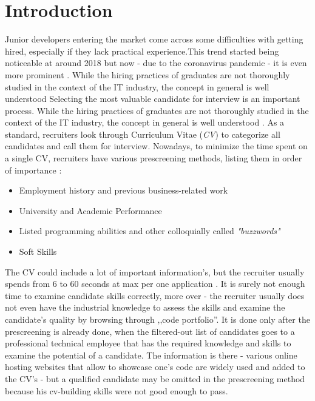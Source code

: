 \section{Introduction}
\label{sec:introduction}

Junior developers entering the market come across some difficulties with getting hired, especially if they lack practical experience\cite{PlightJuniorSoftwareDeveloper}.This trend started being noticeable at around 2018\cite{WhoKilledJuniorDeveloper} but now - due to the coronavirus pandemic - it is even more prominent \cite{EffectsCOVIDJuniorDevelopers}.
While the hiring practices of graduates are not thoroughly studied in the context of
the IT industry, the concept in general is well understood
Selecting the most valuable candidate for interview is an important process. While the hiring practices of graduates are not thoroughly studied in the context of the IT industry, the concept in general is well understood \cite{HiringProcess}. As a standard, recruiters look through Curriculum Vitae (\emph{CV}) to categorize all candidates and call them for interview. Nowadays, to minimize the time spent on a single CV, recruiters have various prescreening methods, listing them in order of importance \cite{SantanderCVLectureScholarship}:
\begin{itemize}
  \item Employment history and previous business-related work
  \item University and Academic Performance
  \item Listed programming abilities and other colloquially called \emph{"buzzwords"}
  \item Soft Skills
\end{itemize}

The CV could include a lot of important information's, but the recruiter usually spends from 6 to 60 seconds at max per one application \cite{SantanderCVLectureScholarship}. It is surely not enough time to examine candidate skills correctly, more over - the recruiter usually does not even have the industrial knowledge to assess the skills and examine the candidate's quality by browsing through ,,code portfolio''. It is done only after the prescreening is already done, when the filtered-out list of candidates goes to a professional technical employee that has the required knowledge and skills to examine the potential of a candidate. The information is there - various online hosting websites that allow to showcase one's code are widely used and added to the CV's - but a qualified candidate may be omitted in the prescreening method because his cv-building skills were not good enough to pass.

